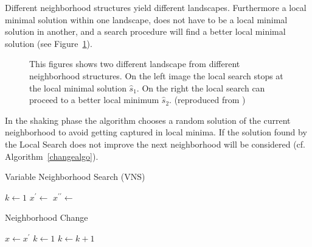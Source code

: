 Different neighborhood structures yield different landscapes. 
Furthermore a local minimal solution within one landscape, does not have to be a local minimal solution in another, and a search procedure will find a better local minimal solution (see Figure~\ref{fig:fig_vns}). 

\begin{figure}[thb]
   \footnotesize
   \centering
   \myfloatalign
   \captionsetup[subfigure]{labelformat=empty} 
    \caption[Search landscapes of two different neighborhoods.]{This figures shows two different landscape from different neighborhood structures. On the left image the local search stops at the local minimal solution $\hat{s}_1$. On the right the local search can proceed to a better local minimum $\hat{s}_2$. (reproduced from \cite{blum2003metaheuristics})}  
     \label{fig:fig_vns}
\end{figure}

In the shaking phase the algorithm chooses a random solution of the current neighborhood to avoid getting captured in local minima. 
If the solution found by the Local Search does not improve the next neighborhood will be considered (cf. Algorithm~\ref{changealgo}).

\begin{algorithm}
\caption{Variable Neighborhood Search (VNS)}
\label{vnsalgo}
\begin{algorithmic}[1]
\Repeat
\State $k \gets 1$
\Repeat
\State $x^{\prime} \gets$ 
\State $x^{\prime \prime}\gets$ 
\State {}
\EndFunction
\end{algorithmic}
\end{algorithm}

\begin{algorithm}
\caption{Neighborhood Change}
\label{changealgo}
\begin{algorithmic}[1]
    \State $x\gets x^\prime$
    \State $k\gets 1$
\Else
    \State $k\gets k+1$
\EndIf

\EndFunction
\end{algorithmic}
\end{algorithm}

